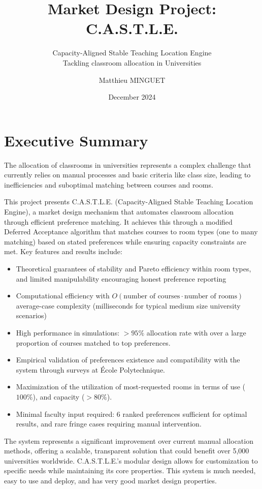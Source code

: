 \documentclass[a4paper, oneside]{article}
\title[\castle{}]{Market Design Project: C.A.S.T.L.E.}
\subtitle{Capacity-Aligned Stable Teaching Location Engine\\
Tackling classroom allocation in Universities}
\author{Matthieu MINGUET}
\date{December 2024}
\theoremstyle{plain}
\newcommand{\castle}{C{\small.}A{\small.}S{\small.}T{\small.}L{\small.}E{\small.}}
\begin{document}
\maketitle

\section*{Executive Summary}
The allocation of classrooms in universities represents a complex challenge that currently relies on manual processes and basic criteria like class size, 
leading to inefficiencies and suboptimal matching between courses and rooms. 

This project presents \castle{} (Capacity-Aligned Stable Teaching Location Engine), a market design mechanism that automates classroom allocation through efficient preference matching.
It achieves this through a modified Deferred Acceptance algorithm that matches courses to room types (one to many matching) based on stated preferences while ensuring capacity constraints are met.
Key features and results include:

\begin{itemize}
	\item Theoretical guarantees of stability and Pareto efficiency within room types, and limited manipulability encouraging honest preference reporting
	\item Computational efficiency with $O(\text{number of courses}\cdot \text{number of rooms})$ average-case complexity (milliseconds for typical medium size university scenarios)
	\item High performance in simulations: $>95\%$ allocation rate with over a large proportion of courses matched to top preferences.
	\item Empirical validation of preferences existence and compatibility with the system through surveys at École Polytechnique.
	\item Maximization of the utilization of most-requested rooms in terms of use ($100\%$), and capacity ($>80\%$).
	\item Minimal faculty input required: 6 ranked preferences sufficient for optimal results, and rare fringe cases requiring manual intervention.
\end{itemize}

The system represents a significant improvement over current manual allocation methods, offering a scalable, transparent solution that could benefit over 5,000 universities worldwide. 
\castle{}'s modular design allows for customization to specific needs while maintaining its core properties. This system is much needed, easy to use and deploy, and has
very good market design properties.
\pagebreak
\end{document}
